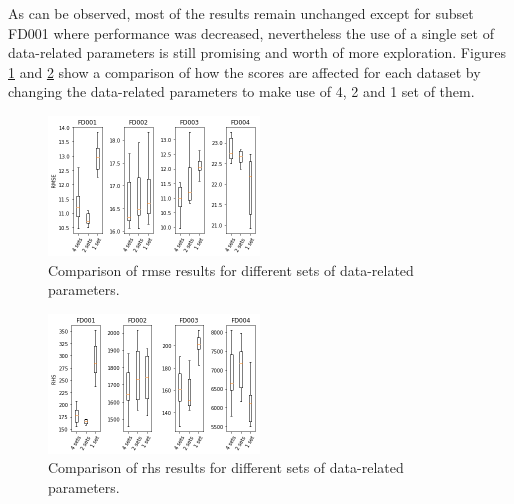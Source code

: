 \pagebreak

As can be observed, most of the results remain unchanged except for subset FD001 where performance was decreased, nevertheless the use of a single set of data-related parameters is still promising and worth of more exploration. Figures \ref{fig:scores_rmse} and \ref{fig:scores_rhs} show a comparison of how the scores are affected for each dataset by changing the data-related parameters to make use of 4, 2 and 1 set of them.

\begin{figure}[!htb]
\centering
\includegraphics[width=0.5\textwidth]{img/rmse_comparisson.png}
\caption{Comparison of \gls{rmse} results for different sets of data-related parameters.}
\label{fig:scores_rmse}
\end{figure}

\begin{figure}[!htb]
\centering
\includegraphics[width=0.5\textwidth]{img/rhs_comparisson.png}
\caption{Comparison of \gls{rhs} results for different sets of data-related parameters.}
\label{fig:scores_rhs}
\end{figure}
